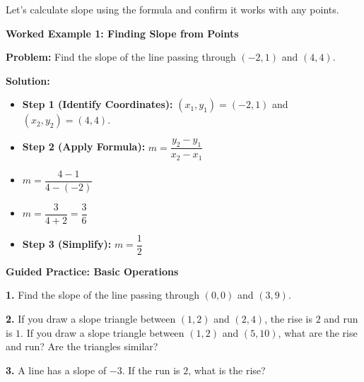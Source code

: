 \documentclass[12pt, letterpaper, fleqn]{article}
\begin{document}
\noindent
Let's calculate slope using the formula and confirm it works with any points.

\vspace{3mm}

\begin{tcolorbox}[colback=white, colframe=black!25, boxrule=0.6pt, arc=4mm, left=6mm, right=6mm, top=5mm, bottom=5mm]

\textbf{Worked Example 1: Finding Slope from Points}

\medskip

\textbf{Problem:} Find the slope of the line passing through $(-2, 1)$ and $(4, 4)$.

\medskip

\textbf{Solution:}
\begin{itemize}
    \item \textbf{Step 1 (Identify Coordinates):} $(x_1, y_1) = (-2, 1)$ and $(x_2, y_2) = (4, 4)$.
    \item \textbf{Step 2 (Apply Formula):} $m = \dfrac{y_2 - y_1}{x_2 - x_1}$
    \item $m = \dfrac{4 - 1}{4 - (-2)}$
    \item $m = \dfrac{3}{4 + 2} = \dfrac{3}{6}$
    \item \textbf{Step 3 (Simplify):} $m = \dfrac{1}{2}$
\end{itemize}

\end{tcolorbox}

\vspace{4mm}

\begin{tcolorbox}[colback=white!15, colframe=black, boxrule=1.5pt, arc=4mm, left=6mm, right=6mm, top=5mm, bottom=5mm]

\textbf{Guided Practice: Basic Operations}

\medskip

\noindent
\textbf{1.} Find the slope of the line passing through $(0, 0)$ and $(3, 9)$.
\vspace{1.5cm}

\noindent
\textbf{2.} If you draw a slope triangle between $(1, 2)$ and $(2, 4)$, the rise is $2$ and run is $1$. If you draw a slope triangle between $(1, 2)$ and $(5, 10)$, what are the rise and run? Are the triangles similar?
\vspace{2.5cm}

\noindent
\textbf{3.} A line has a slope of $-3$. If the run is $2$, what is the rise?
\vspace{1.5cm}

\end{tcolorbox}
\end{document}
